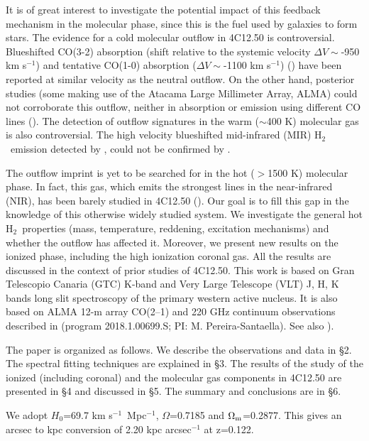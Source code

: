 \documentclass{aa}
\newcommand{\kms}{km s$^{-1}$~}
\newcommand{\hmol}{H$_2$~}
\begin{document}
It is of great interest to investigate the potential impact of this feedback mechanism in the molecular phase, since this is the fuel used by galaxies to form stars. The evidence for a cold molecular outflow in 4C12.50 is controversial.
Blueshifted CO(3-2) absorption  (shift relative to the systemic velocity $\Delta V\sim$-950 km s$^{-1}$)   and tentative CO(1-0) absorption ($\Delta V\sim$-1100 km s$^{-1}$) (\citealt{Dasyra2012}) have been  reported at  similar velocity as the neutral outflow. On the other hand,  posterior studies (some making use of the Atacama Large Millimeter Array, ALMA)  could not corroborate this outflow, neither  in  absorption or emission using different CO lines  (\citealt{Dasyra2014,Fotopoulou2019,Lamperti2022}). The detection of outflow signatures in the warm ($\sim$400 K)  molecular gas is also controversial. The high velocity blueshifted mid-infrared (MIR) \hmol emission detected by \cite{Dasyra2011}, could not be confirmed by \cite{Guillard2012}.   


The outflow  imprint is yet to be searched for in the hot ($>$1500 K) molecular phase. In fact, this  gas, which emits the strongest lines in the near-infrared (NIR),
  has been barely studied in 4C12.50 (\citealt{Veilleux1997,Rose2018}). Our goal is to fill this gap in the knowledge of this otherwise widely studied system. We investigate 
   the general hot \hmol properties (mass, temperature, reddening, excitation mechanisms) and whether the  outflow has affected it.  Moreover, we present new results on the ionized phase, including the high ionization coronal gas. All the results are discussed in the context of prior studies of 4C12.50. This work is based on  Gran Telescopio Canaria (GTC)  K-band and Very Large Telescope (VLT) J, H, K bands long slit spectroscopy of the primary western active nucleus. It is also based on ALMA 12-m array CO(2–1) and 220 GHz continuum  observations described in \cite{Lamperti2022} (program 2018.1.00699.S; PI: M. Pereira-Santaella). See also \citealt{Pereira2021}).


The paper is organized as follows. We describe the observations and data in  \S2. The spectral fitting  techniques are explained in \S3.  The results of the study of the ionized (including coronal)  and the molecular gas components in 4C12.50 are presented in \S4 and discussed in \S5.  The summary and conclusions are in \S6.



We adopt  $H_{0}$=69.7 \kms Mpc$^{-1}$, $\Omega$=0.7185 and $\Omega_{\rm m}$=0.2877. This gives an arcsec to kpc conversion of 2.20 kpc arcsec$^{-1}$  at z=0.122.
\end{document}
